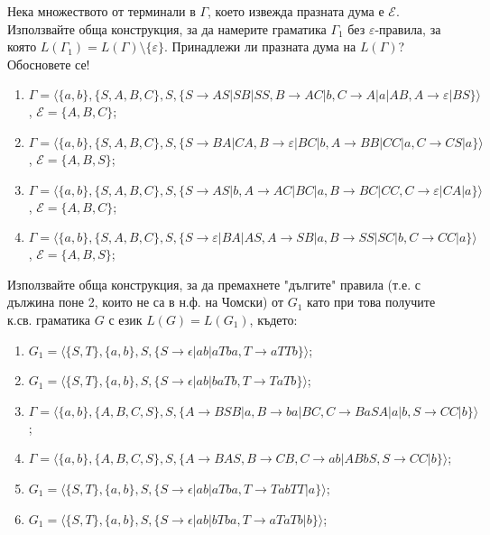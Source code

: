 \begin{problem} Нека множеството от терминали в $\Gamma$, което извежда празната дума е $\mathcal{E}$. Използвайте обща конструкция, за да намерите граматика $\Gamma_1$ без $\varepsilon$-правила, за която $L(\Gamma_1)=L(\Gamma)\setminus\{\varepsilon\}$. Принадлежи ли празната дума на $L(\Gamma)$? Обосновете се!

\begin{enumerate}
\item
$\Gamma=\langle\{a,b\},\{S,A,B,C\},S,\{S\rightarrow AS|SB|SS,B\rightarrow AC|b, C\rightarrow A|a|AB,A\rightarrow \varepsilon|BS\}\rangle$, $\mathcal{E}=\{A,B,C\}$;

\item
$\Gamma=\langle\{a,b\},\{S,A,B,C\},S,\{S\rightarrow BA|CA,B\rightarrow \varepsilon |BC|b,A\rightarrow BB|CC|a,
C\rightarrow CS|a\}\rangle$, $\mathcal{E}=\{A,B,S\}$;

\item
$\Gamma=\langle\{a,b\},\{S,A,B,C\},S,\{S\rightarrow AS|b,A\rightarrow AC|BC|a, B\rightarrow BC|CC,C\rightarrow \varepsilon|CA|a\}\rangle$, $\mathcal{E}=\{A,B,C\}$;

\item
$\Gamma=\langle\{a,b\},\{S,A,B,C\},S,\{S\rightarrow \varepsilon|BA|AS,A\rightarrow SB|a,B\rightarrow SS|SC|b,
C\rightarrow CC|a\}\rangle$, $\mathcal{E}=\{A,B,S\}$; 

\end{enumerate} 
\end{problem}

\begin{problem}
Използвайте обща конструкция, за да премахнете "дългите" правила (т.е. с дължина поне 2, които не са в н.ф. на Чомски) от $ G_1$ като при това получите к.св. граматика $G$ с език $L(G)=L(G_1)$, където:
\begin{enumerate}
\item
$G_1=\langle\{S,T\},\{a,b\},S,\{S \rightarrow \epsilon|ab|aTba,T\rightarrow aTTb\}\rangle$;
\item
$G_1=\langle\{S,T\},\{a,b\},S,\{S \rightarrow \epsilon|ab|baTb,T\rightarrow TaTb\}\rangle$;
\item
$\Gamma=\langle\{a,b\},\{A,B,C,S\},S,\{A\rightarrow BSB|a,B\rightarrow ba|BC,C\rightarrow BaSA|a|b,S\rightarrow CC|b\}\rangle$;
\item
$\Gamma=\langle\{a,b\},\{A,B,C,S\},S,\{A\rightarrow BAS,B\rightarrow CB,C\rightarrow ab|ABbS,S\rightarrow CC|b\}\rangle$;
\item
$G_1=\langle\{S,T\},\{a,b\},S,\{S \rightarrow \epsilon|ab|aTba,T\rightarrow TabTT|a\}\rangle$;
\item
$G_1=\langle\{S,T\},\{a,b\},S,\{S \rightarrow \epsilon|ab|bTba,T\rightarrow aTaTb|b\}\rangle$;
\end{enumerate}
\end{problem}


